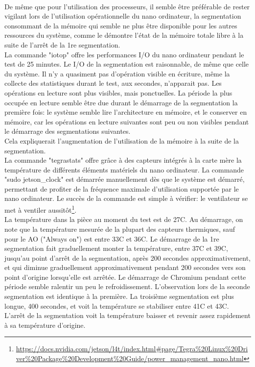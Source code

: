 \vspace{\baselineskip}
\\
\noindent De même que pour l'utilisation des processeurs, il semble être préférable de rester vigilant lors de l'utilisation opérationnelle du nano ordinateur, la segmentation consommant de la mémoire qui semble ne plus être disponible pour les autres ressources du système, comme le démontre l'état de la mémoire totale libre à la suite de l'arrêt de la 1re segmentation. 
\vspace{\baselineskip}
\\
\noindent La commande "iotop" offre les performances I/O du nano ordinateur pendant le test de 25 minutes. Le I/O de la segmentation est raisonnable, de même que celle du système. Il n'y a quasiment pas d'opération visible en écriture, même la collecte des statistiques durant le test, aux secondes, n'apparait pas. Les opérations en lecture sont plus visibles, mais ponctuelles. La période la plus occupée en lecture semble être due durant le démarrage de la segmentation la première fois: le système semble lire l'architecture en mémoire, et le conserver en mémoire, car les opérations en lecture suivantes sont peu ou non visibles pendant le démarrage des segmentations suivantes.
\vspace{\baselineskip}
\\
\noindent Cela expliquerait l'augmentation de l'utilisation de la mémoire à la suite de la segmentation. 
\vspace{\baselineskip}
\\
\noindent La commande "tegrastats" offre grâce à des capteurs intégrés à la carte mère la température de différents éléments matériels du nano ordinateur. La commande "sudo jetson\_clock" est démarrée manuellement dès que le système est démarré, permettant de profiter de la fréquence maximale d'utilisation supportée par le nano ordinateur. Le succès de la commande est simple à vérifier: le ventilateur se met à ventiler aussitôt\footnote{\url{https://docs.nvidia.com/jetson/l4t/index.html#page/Tegra\%20Linux\%20Driver\%20Package\%20Development\%20Guide/power_management_nano.html}}.
\vspace{\baselineskip}
\\
\noindent La température dans la pièce au moment du test est de 27C. Au démarrage, on note que la température mesurée de la plupart des capteurs thermiques, sauf pour le AO ("Always on") est entre 33C et 36C. Le démarrage de la 1re segmentation fait graduellement monter la température, entre 37C et 39C, jusqu'au point d'arrêt de la segmentation, après 200 secondes approximativement, et qui diminue graduellement approximativement pendant 200 secondes vers son point d'origine lorsqu'elle est arrêtée. Le démarrage de Chromium pendant cette période semble ralentir un peu le refroidissement. L'observation lors de la seconde segmentation est identique à la première. La troisième segmentation est plus longue, 400 secondes, et voit la température se stabiliser entre 41C et 43C. L'arrêt de la segmentation voit la température baisser et revenir assez rapidement à sa température d'origine. 
